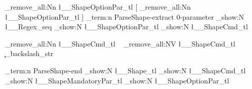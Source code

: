 {{         \tl_remove_all:Nn \l__ShapeOptionPar_tl {[}
         \tl_remove_all:Nn \l__ShapeOptionPar_tl {]}
    }
            \iow_term:n {ParseShape-extract 0-parameter}
            \seq_show:N \l__Regex_seq 
            \tl_show:N \l__ShapeOptionPar_tl
            \tl_show:N \l__ShapeCmd_tl


      \tl_remove_all:Nn  \l__ShapeCmd_tl {~}
      \tl_remove_all:NV  \l__ShapeCmd_tl \c_backslash_str
 

		\iow_term:n {ParseShape-end}
		\tl_show:N \l__Shape_tl
		\tl_show:N \l__ShapeCmd_tl 
		\tl_show:N \l__ShapeMandatoryPar_tl
		\tl_show:N \l__ShapeOptionPar_tl

    
}

\ExplSyntaxOff

